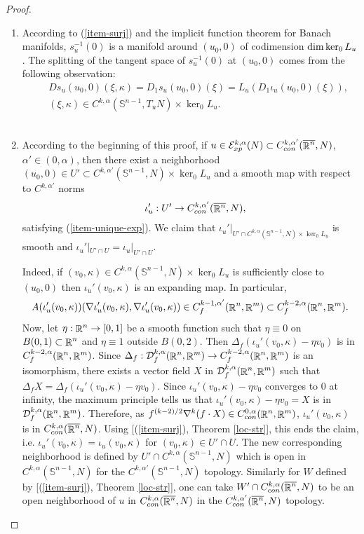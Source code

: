 \documentclass[a4paper,11pt,reqno]{amsart}
\def\dim{\mathop{\rm dim}\nolimits}
\def\dim{\mathop{\rm dim}\nolimits}
\def\R{\mathop{\rm \mathbb{R}}\nolimits}
\newcommand{\Ent}{\mathcal{E}}
\begin{document}
\begin{proof}
\begin{enumerate}
\item According to (\ref{item-surj}) and the implicit function theorem for Banach manifolds, $s_u^{-1}(0)$ is a manifold around $(u_0,0)$ of codimension $\dim \ker_0L_u$. The splitting of the tangent space of $s_u^{-1}(0)$ at $(u_0,0)$ comes from the following observation:
\begin{eqnarray}
&&Ds_u(u_0,0)(\xi,\kappa)=D_1s_u(u_0,0)(\xi)=L_u(D_1\iota_u(u_0,0)(\xi)),\label{split-diff-sub}\\
&&(\xi,\kappa)\in C^{k,\alpha}(\mathbb{S}^{n-1},T_uN)\times\ker_0L_u.
\end{eqnarray}\\

\item According to the beginning of this proof, if $u\in\Ent_{xp}^{k,\alpha}(N)\subset C_{con}^{k,\alpha'}(\overline{\R^n},N)$, $\alpha'\in(0,\alpha)$, then there exist a neighborhood $(u_0,0)\in U'\subset C^{k,\alpha'}(\mathbb{S}^{n-1},N)\times \ker_0L_u$ and a smooth map with respect to $C^{k,\alpha'}$ norms 
\begin{eqnarray*}
&&\iota_u':U'\rightarrow C_{con}^{k,\alpha'}(\overline{\R^n},N),
\end{eqnarray*}
satisfying (\ref{item-unique-exp}). We claim that $\iota_u'|_{U'\cap C^{k,\alpha}(\mathbb{S}^{n-1},N)\times \ker_0L_u}$ is smooth and $\iota_u'|_{U'\cap U}=\iota_u|_{U'\cap U}$.

Indeed, if $(v_0,\kappa)\in C^{k,\alpha}(\mathbb{S}^{n-1},N)\times \ker_0L_u$ is sufficiently close to $(u_0,0)$ then $\iota_u'(v_0,\kappa)$ is an expanding map. In particular, $$A( \iota_u'(v_0,\kappa))(\nabla \iota_u'(v_0,\kappa),\nabla \iota_u'(v_0,\kappa))\in C^{k-1,\alpha'}_f(\R^n,\R^m)\subset C_f^{k-2,\alpha}(\R^n,\R^m).$$ 
Now, let $\eta :\R^n\rightarrow [0,1]$ be a smooth function such that $\eta\equiv 0$ on $B(0,1)\subset \R^n$ and $\eta\equiv 1$ outside $B(0,2)$. Then $\Delta_f(\iota_u'(v_0,\kappa)-\eta v_0)$ is in $C_f^{k-2,\alpha}(\R^n,\R^m)$. Since $\Delta_f:\mathcal{D}_f^{k,\alpha}(\R^n,\R^m)\rightarrow C_f^{k-2,\alpha}(\R^n,\R^m)$ is an isomorphism, there exists a vector field $X$ in $\mathcal{D}_f^{k,\alpha}(\R^n,\R^m)$ such that $\Delta_fX=\Delta_f(\iota_u'(v_0,\kappa)-\eta v_0).$ Since $\iota_u'(v_0,\kappa)-\eta v_0$ converges to $0$ at infinity, the maximum principle tells us that $\iota_u'(v_0,\kappa)-\eta v_0=X$ is in $\mathcal{D}_f^{k,\alpha}(\R^n,\R^m)$. Therefore, as $f^{(k-2)/2}\nabla^k (f\cdot X)\in C_{con}^{0,\alpha}(\R^n,\R^m)$, $\iota_u'(v_0,\kappa)$ is in $C_{con}^{k,\alpha}(\overline{\R^n},N)$. Using [(\ref{item-surj}), Theorem \ref{loc-str}], this ends the claim, i.e. $\iota_u'(v_0,\kappa)=\iota_u(v_0,\kappa)$ for $(v_0,\kappa)\in U'\cap U$.
 The new corresponding neighborhood is defined by $U'\cap C^{k,\alpha}(\mathbb{S}^{n-1},N)$ which is open in $C^{k,\alpha}(\mathbb{S}^{n-1},N)$ for the $C^{k,\alpha'}(\mathbb{S}^{n-1},N)$ topology. Similarly for $W$ defined by [(\ref{item-surj}), Theorem \ref{loc-str}], one can take $W'\cap C_{con}^{k,\alpha}(\overline{\R^n},N)$ to be an open neighborhood of $u$ in $C_{con}^{k,\alpha}(\overline{\R^n},N)$ in the $C_{con}^{k,\alpha'}(\overline{\R^n},N)$ topology.


\end{enumerate}
\end{proof}
\end{document}
